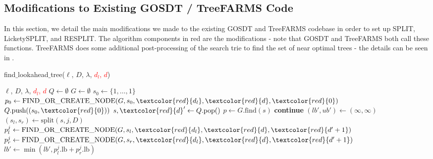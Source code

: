 \subsection{Modifications to Existing GOSDT / TreeFARMS Code}\label{sec:gosdt_details}
In this section, we detail the main modifications we made to the existing GOSDT and TreeFARMS codebase in order to set up SPLIT, LicketySPLIT, and RESPLIT. The algorithm components in red are the modifications - note that GOSDT and TreeFARMS both call these functions. TreeFARMS does some additional post-processing of the search trie to find the set of near optimal trees - the details can be seen in \cite{xin2022treefarms}. 
\begin{algorithm}[H]
\caption{find$\_$lookahead$\_$tree($\ell$, $D$, $\lambda$, \textcolor{red}{$d_l$, $d$})}
\begin{algorithmic}[1]
\REQUIRE $\ell$, $D$, $\lambda$, \textcolor{red}{$d_l$, $d$} \COMMENT{\textcolor{commentgreen}{loss function, dataset, regularizer, lookahead depth, global depth budget}}
\STATE $Q \gets \emptyset$ \COMMENT{\textcolor{commentgreen}{ priority queue}}
\STATE $G \gets \emptyset$ \COMMENT{\textcolor{commentgreen}{ dependency graph}}
\STATE $s_0 \gets \{1, \ldots, 1\}$ \COMMENT{\textcolor{commentgreen}{ bit-vector of 1's of length $n$}}
\STATE $p_0 \gets \text{FIND\_OR\_CREATE\_NODE}(G, s_0,\textcolor{red}{d_l}, \textcolor{red}{d}, \textcolor{red}{0})$ \COMMENT{\textcolor{commentgreen}{ root (with depth 0)}}
\STATE $Q.\text{push}((s_0,\textcolor{red}{0}))$ \COMMENT{\textcolor{commentgreen}{ add to priority queue}}
    \STATE $s, \textcolor{red}{d}^\prime \gets Q.\text{pop}()$ \COMMENT{\textcolor{commentgreen}{index of problem to work on}}
    \STATE $p \gets G.\text{find}(s)$ \COMMENT{\textcolor{commentgreen}{ find problem to work on}}
        \STATE \textbf{continue} \COMMENT{\textcolor{commentgreen}{ problem already solved}}
    \ENDIF
    \STATE $(lb', ub') \gets (\infty, \infty)$ \COMMENT{\textcolor{commentgreen}{ loose starting bounds}}
        \STATE $(s_l, s_r) \gets \text{split}(s, j, D)$ \COMMENT{\textcolor{commentgreen}{ create children}}
        \STATE $p_l^j \gets \text{FIND\_OR\_CREATE\_NODE}(G, s_l,\textcolor{red}{d_l}, \textcolor{red}{d}, \textcolor{red}{d^\prime+1})$
        \STATE $p_r^j \gets \text{FIND\_OR\_CREATE\_NODE}(G, s_r,\textcolor{red}{d_l},\textcolor{red}{d}, \textcolor{red}{d^\prime+1})$
        \STATE $lb' \gets \min(lb', p_l^j.\text{lb} + p_r^j.\text{lb})$ \COMMENT{\textcolor{commentgreen}{ create bounds as if $j$ were chosen for splitting}}

\end{algorithmic}
\end{algorithm}
